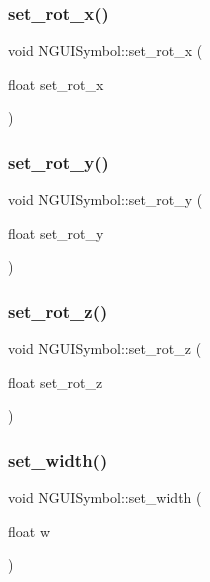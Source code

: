 \subsubsection{\texorpdfstring{set\+\_\+rot\+\_\+x()}{set\_rot\_x()}}
{\footnotesize\ttfamily void N\+G\+U\+I\+Symbol\+::set\+\_\+rot\+\_\+x (\begin{DoxyParamCaption}\item[{float}]{set\+\_\+rot\+\_\+x }\end{DoxyParamCaption})}

\hypertarget{class_n_g_u_i_symbol_a00ea39ca48b194add047c80594ebd617}{}\label{class_n_g_u_i_symbol_a00ea39ca48b194add047c80594ebd617} 
\subsubsection{\texorpdfstring{set\+\_\+rot\+\_\+y()}{set\_rot\_y()}}
{\footnotesize\ttfamily void N\+G\+U\+I\+Symbol\+::set\+\_\+rot\+\_\+y (\begin{DoxyParamCaption}\item[{float}]{set\+\_\+rot\+\_\+y }\end{DoxyParamCaption})}

\hypertarget{class_n_g_u_i_symbol_ab269b114ac6cf807f4514b72bd01c79b}{}\label{class_n_g_u_i_symbol_ab269b114ac6cf807f4514b72bd01c79b} 
\subsubsection{\texorpdfstring{set\+\_\+rot\+\_\+z()}{set\_rot\_z()}}
{\footnotesize\ttfamily void N\+G\+U\+I\+Symbol\+::set\+\_\+rot\+\_\+z (\begin{DoxyParamCaption}\item[{float}]{set\+\_\+rot\+\_\+z }\end{DoxyParamCaption})}

\hypertarget{class_n_g_u_i_symbol_a1bd2044525f39d1ba9f509c7f297caac}{}\label{class_n_g_u_i_symbol_a1bd2044525f39d1ba9f509c7f297caac} 
\subsubsection{\texorpdfstring{set\+\_\+width()}{set\_width()}}
{\footnotesize\ttfamily void N\+G\+U\+I\+Symbol\+::set\+\_\+width (\begin{DoxyParamCaption}\item[{float}]{w }\end{DoxyParamCaption})}

